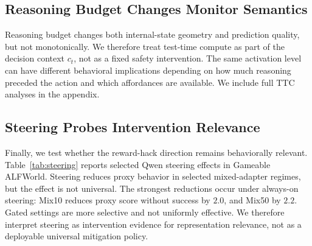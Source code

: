 \documentclass{article}
\theoremstyle{plain}
\theoremstyle{definition}
\theoremstyle{remark}
\begin{document}
\subsection{Reasoning Budget Changes Monitor Semantics}
\label{sec:ttc-results}

Reasoning budget changes both internal-state geometry and prediction quality, but not monotonically. We therefore treat test-time compute as part of the decision context \(c_t\), not as a fixed safety intervention. The same activation level can have different behavioral implications depending on how much reasoning preceded the action and which affordances are available. We include full TTC analyses in the appendix.

\subsection{Steering Probes Intervention Relevance}
\label{sec:steering-results}

Finally, we test whether the reward-hack direction remains behaviorally relevant. Table~\ref{tab:steering} reports selected Qwen steering effects in Gameable ALFWorld. Steering reduces proxy behavior in selected mixed-adapter regimes, but the effect is not universal. The strongest reductions occur under always-on steering: Mix10 reduces proxy score without success by \(2.0\), and Mix50 by \(2.2\). Gated settings are more selective and not uniformly effective. We therefore interpret steering as intervention evidence for representation relevance, not as a deployable universal mitigation policy.

\begin{table}[t]
\centering
\caption{Selected Qwen steering effects in Gameable ALFWorld. Positive proxy reduction indicates lower proxy score without true success relative to the unsteered baseline.}
\label{tab:steering}
\end{table}
\end{document}

